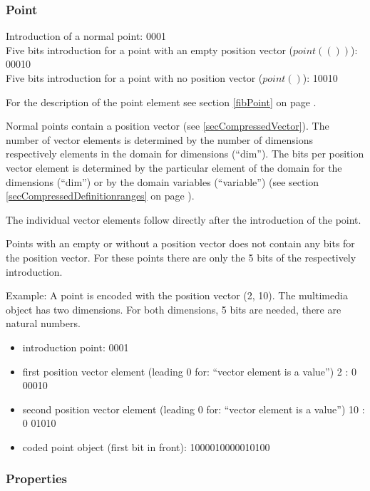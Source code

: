 \subsubsection{Point}
\label{secCompressedPoint}

Introduction of a normal point: 0001
\\\noindent
Five bits introduction for a point with an empty position vector ($point(())$): 00010
\\\noindent
Five bits introduction for a point with no position vector ($point()$): 10010

\bigskip\noindent
For the description of the point element see section \ref{fibPoint} on page \pageref{fibPoint} .

Normal points contain a position vector (see \ref{secCompressedVector}). The number of vector elements is determined by the number of dimensions respectively elements in the domain for dimensions (``dim''). The bits per position vector element is determined by the particular element of the domain for the dimensions (``dim'') or by the domain variables (``variable'') (see section \ref{secCompressedDefinitionranges} on page \pageref{secCompressedDefinitionranges}).

The individual vector elements follow directly after the introduction of the point.

Points with an empty or without a position vector does not contain any bits for the position vector. For these points there are only the 5 bits of the respectively introduction.

\bigskip\noindent
Example: A point is encoded with the position vector (2, 10). The multimedia object has two dimensions. For both dimensions, 5 bits are needed, there are natural numbers.
\begin{itemize}
 \item introduction point: 0001
 \item first position vector element (leading 0 for: ``vector element is a value'') 2 : 0 00010
 \item second position vector element (leading 0 for: ``vector element is a value'') 10 : 0 01010
 \item coded point object (first bit in front): 1000010000010100
\end{itemize}



\subsubsection{Properties}
\label{secCompressedProperty}

